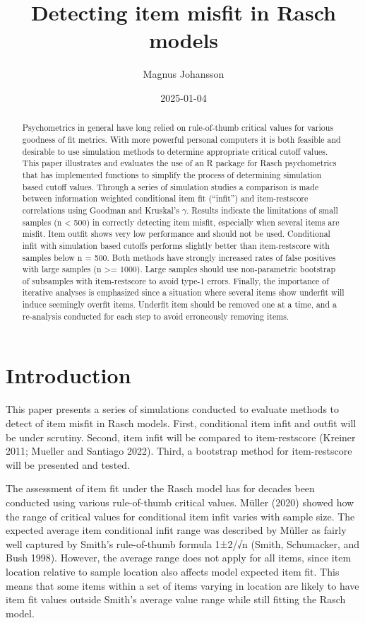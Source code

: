\documentclass[
  letterpaper,
  DIV=11,
  numbers=noendperiod]{scrartcl}
\title{Detecting item misfit in Rasch models}
\author{Magnus Johansson}
\date{2025-01-04}
\begin{document}
\maketitle
\begin{abstract}
Psychometrics in general have long relied on rule-of-thumb critical
values for various goodness of fit metrics. With more powerful personal
computers it is both feasible and desirable to use simulation methods to
determine appropriate critical cutoff values. This paper illustrates and
evaluates the use of an R package for Rasch psychometrics that has
implemented functions to simplify the process of determining simulation
based cutoff values. Through a series of simulation studies a comparison
is made between information weighted conditional item fit (``infit'')
and item-restscore correlations using Goodman and Kruskal's \(\gamma\).
Results indicate the limitations of small samples (n \textless{} 500) in
correctly detecting item misfit, especially when several items are
misfit. Item outfit shows very low performance and should not be used.
Conditional infit with simulation based cutoffs performs slightly better
than item-restscore with samples below n = 500. Both methods have
strongly increased rates of false positives with large samples (n
\textgreater= 1000). Large samples should use non-parametric bootstrap
of subsamples with item-restscore to avoid type-1 errors. Finally, the
importance of iterative analyses is emphasized since a situation where
several items show underfit will induce seemingly overfit items.
Underfit item should be removed one at a time, and a re-analysis
conducted for each step to avoid erroneously removing items.
\end{abstract}


\section{Introduction}\label{introduction}

This paper presents a series of simulations conducted to evaluate
methods to detect of item misfit in Rasch models. First, conditional
item infit and outfit will be under scrutiny. Second, item infit will be
compared to item-restscore (Kreiner 2011; Mueller and Santiago 2022).
Third, a bootstrap method for item-restscore will be presented and
tested.

The assessment of item fit under the Rasch model has for decades been
conducted using various rule-of-thumb critical values. Müller (2020)
showed how the range of critical values for conditional item infit
varies with sample size. The expected average item conditional infit
range was described by Müller as fairly well captured by Smith's
rule-of-thumb formula 1±2/√n (Smith, Schumacker, and Bush 1998).
However, the average range does not apply for all items, since item
location relative to sample location also affects model expected item
fit. This means that some items within a set of items varying in
location are likely to have item fit values outside Smith's average
value range while still fitting the Rasch model.
\end{document}
